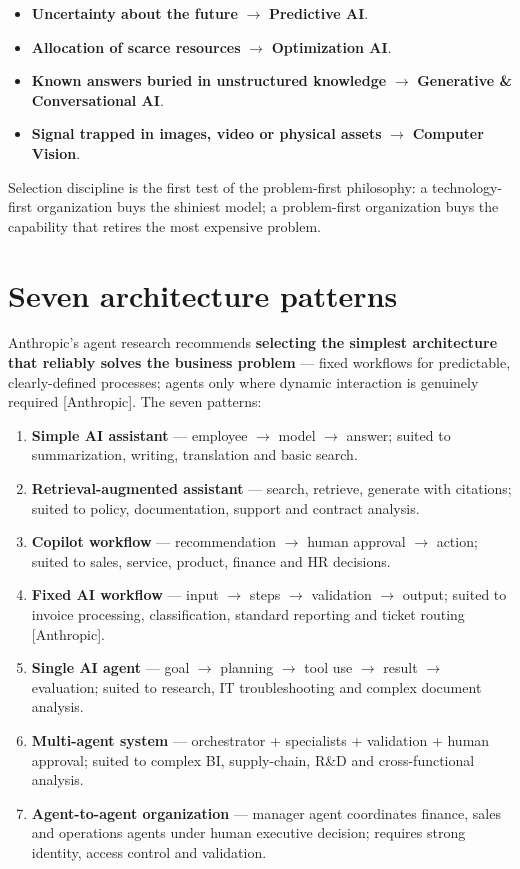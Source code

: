 \begin{itemize}
  \item \textbf{Uncertainty about the future} $\rightarrow$ \textbf{Predictive AI}.
  \item \textbf{Allocation of scarce resources} $\rightarrow$ \textbf{Optimization AI}.
  \item \textbf{Known answers buried in unstructured knowledge} $\rightarrow$ \textbf{Generative \& Conversational AI}.
  \item \textbf{Signal trapped in images, video or physical assets} $\rightarrow$ \textbf{Computer Vision}.
\end{itemize}

Selection discipline is the first test of the problem-first philosophy: a
technology-first organization buys the shiniest model; a problem-first
organization buys the capability that retires the most expensive problem.

\section{Seven architecture patterns}

Anthropic's agent research recommends \textbf{selecting the simplest
architecture that reliably solves the business problem} — fixed workflows for
predictable, clearly-defined processes; agents only where dynamic interaction
is genuinely required [Anthropic]. The seven patterns:

\begin{enumerate}
  \item \textbf{Simple AI assistant} — employee $\rightarrow$ model
        $\rightarrow$ answer; suited to summarization, writing, translation
        and basic search.
  \item \textbf{Retrieval-augmented assistant} — search, retrieve, generate
        with citations; suited to policy, documentation, support and
        contract analysis.
  \item \textbf{Copilot workflow} — recommendation $\rightarrow$ human
        approval $\rightarrow$ action; suited to sales, service, product,
        finance and HR decisions.
  \item \textbf{Fixed AI workflow} — input $\rightarrow$ steps $\rightarrow$
        validation $\rightarrow$ output; suited to invoice processing,
        classification, standard reporting and ticket routing
        [Anthropic].
  \item \textbf{Single AI agent} — goal $\rightarrow$ planning $\rightarrow$
        tool use $\rightarrow$ result $\rightarrow$ evaluation; suited to
        research, IT troubleshooting and complex document analysis.
  \item \textbf{Multi-agent system} — orchestrator + specialists +
        validation + human approval; suited to complex BI, supply-chain,
        R\&D and cross-functional analysis.
  \item \textbf{Agent-to-agent organization} — manager agent coordinates
        finance, sales and operations agents under human executive decision;
        requires strong identity, access control and validation.
\end{enumerate}

